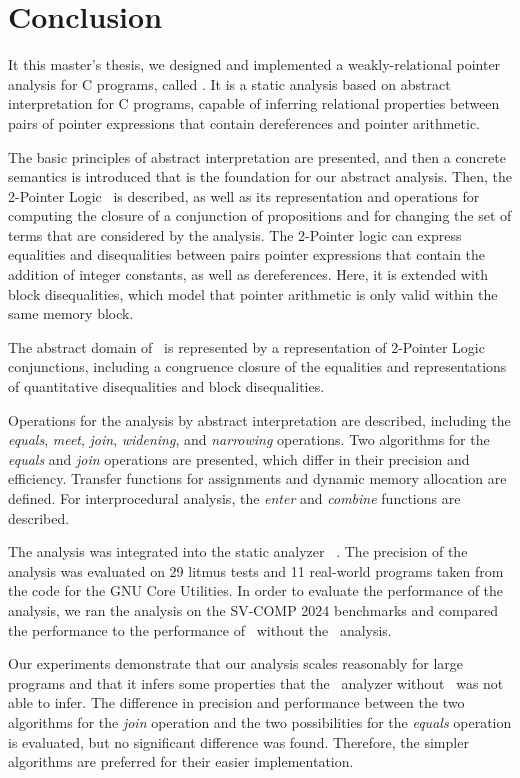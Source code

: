 \chapter{Conclusion}\label{chapter:conclusion}

It this master's thesis, we designed and implemented a weakly-relational pointer analysis for C programs, called \cpo.
It is a static analysis based on abstract interpretation for C programs,
capable of inferring relational properties between pairs of pointer expressions that contain dereferences and pointer arithmetic.

The basic principles of abstract interpretation are presented, and then a concrete semantics is introduced that is the foundation for our abstract analysis.
Then, the 2-Pointer Logic~\cite{2pointer} is described, as well as its representation and operations for computing the closure of a conjunction of propositions and for changing the set of terms that are considered by the analysis.
The 2-Pointer logic can express equalities and disequalities between pairs pointer expressions that contain the addition of integer constants, as well as dereferences.
Here, it is extended with block disequalities, which model that pointer arithmetic is only valid within the same memory block.

The abstract domain of \cpo\ is represented by a representation of 2-Pointer Logic conjunctions, including a congruence closure of the equalities and representations of quantitative disequalities and block disequalities.

Operations for the analysis by abstract interpretation are described, including the \emph{equals}, \emph{meet}, \emph{join}, \emph{widening}, and \emph{narrowing} operations.
Two algorithms for the \emph{equals} and \emph{join} operations are presented, which differ in their precision and efficiency.
Transfer functions for assignments and dynamic memory allocation are defined.
For interprocedural analysis, the \emph{enter} and \emph{combine} functions are described.

The analysis was integrated into the static analyzer \goblint~\cite{goblint}.
The precision of the analysis was evaluated on 29 litmus tests and 11 real-world programs taken from the code for the GNU Core Utilities.
In order to evaluate the performance of the analysis, we ran the analysis on the SV-COMP 2024 benchmarks and compared the performance to the performance of \goblint\ without the \cpo\ analysis.

Our experiments demonstrate that our analysis scales reasonably for large programs and
that it infers some properties that the \goblint\ analyzer without \cpo\ was not able to infer.
The difference in precision and performance between the two algorithms for the \emph{join} operation and the two possibilities for the \emph{equals} operation is evaluated,
but no significant difference was found.
Therefore, the simpler algorithms are preferred for their easier implementation.

